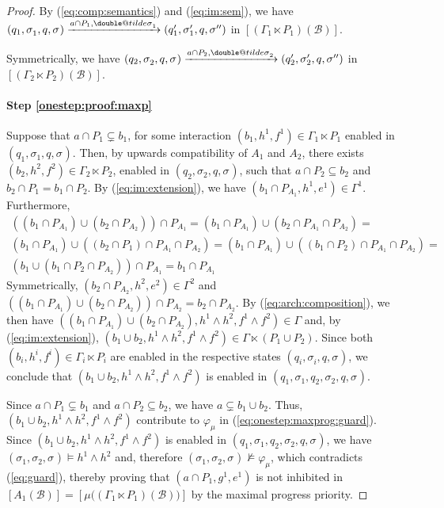 \documentclass{llncs}
\makeatletter
\newcommand{\eq}[1]{(\ref{eq:#1})}
\newcommand{\cB}{\ensuremath{\mathcal{B}}}
\newcommand{\goesto}[2][]{\ensuremath{\xrightarrow[#1]{#2}}}
\newcommand{\val}[3][]{\ensuremath{#1{\sigma}^{#2}_{#3}}}
\newcommand{\primeit}[1]{#1'}
\newcommand{\doubleprimeit}[1]{#1''}
\newcommand{\semopen}[1]{\ensuremath{[{#1}]}}
\newcommand{\IMextend}[2]{\ensuremath{#1 \ltimes #2}}
\newcommand{\expmix}{\wedge}
\newcommand{\doubletilde}[1]{{%
  \mathpalette\double@tilde{#1}%
}}
\newcommand{\double@tilde}[2]{%
  \sbox\z@{$\m@th#1\tilde{#2}$}%
  \ht\z@=.9\ht\z@
  \tilde{\box\z@}%
}
\makeatother
\begin{document}
\begin{proof}
  By \eq{comp:semantics} and \eq{im:sem}, we have
  $
  (q_1, \val{}{1}, q, \val{}{})
  \goesto{a \cap P_1, \val[\doubletilde]{}{1}}
  (q_1', \val[\primeit]{}{1}, q, \val[\doubleprimeit]{}{})
  $ in $\semopen{(\IMextend{\Gamma_1}{P_1})(\cB)}$.

  Symmetrically, we have 
  $
  (q_2, \val{}{2}, q, \val{}{})
  \goesto{a \cap P_2, \val[\doubletilde]{}{2}}
  (q_2', \val[\primeit]{}{2}, q, \val[\doubleprimeit]{}{})
  $ in $\semopen{(\IMextend{\Gamma_2}{P_2})(\cB)}$.   
   
  \paragraph*{Step \ref{onestep:proof:maxp}}
  Suppose that $a \cap P_1 \varsubsetneq b_1$, for some interaction
  $(b_1, h^1, f^1) \in \IMextend{\Gamma_1}{P_1}$ enabled in $(q_1,
  \val{}{1}, q, \val{}{})$.  Then, by upwards compatibility of $A_1$
  and $A_2$, there exists $(b_2, h^2, f^2) \in
  \IMextend{\Gamma_2}{P_2}$, enabled in $(q_2, \val{}{2}, q,
  \val{}{})$, such that $a \cap P_2 \subseteq b_2$ and $b_2 \cap P_1 =
  b_1 \cap P_2$.  By \eq{im:extension}, we have $(b_1 \cap P_{A_1},
  h^1, e^1) \in \Gamma^1$.  Furthermore,
%
  \begin{multline*}
    ((b_1 \cap P_{A_1}) \cup (b_2 \cap P_{A_2}))  \cap P_{A_1} =
    (b_1 \cap P_{A_1}) \cup (b_2 \cap P_{A_1} \cap P_{A_2}) =\\
    (b_1 \cap P_{A_1}) \cup ((b_2 \cap P_1) \cap P_{A_1} \cap P_{A_2}) =  
    (b_1 \cap P_{A_1}) \cup ((b_1 \cap P_2) \cap P_{A_1} \cap P_{A_2}) =\\
    (b_1 \cup (b_1 \cap P_2 \cap P_{A_2})) \cap P_{A_1} =
    b_1 \cap P_{A_1} 
  \end{multline*}
%
  Symmetrically, $(b_2 \cap P_{A_2}, h^2, e^2) \in \Gamma^2$ and
  $((b_1 \cap P_{A_1}) \cup (b_2 \cap P_{A_2})) \cap P_{A_2} = b_2
  \cap P_{A_2}$.  By \eq{arch:composition}, we then have $((b_1 \cap
  P_{A_1}) \cup (b_2 \cap P_{A_2}), h^1 \land h^2, f^1 \expmix f^2)
  \in \Gamma$ and, by \eq{im:extension}, $(b_1 \cup b_2, h^1 \land
  h^2, f^1 \expmix f^2) \in \IMextend{\Gamma}{(P_1 \cup P_2)}$.
%
  Since both $(b_i, h^i, f^i) \in \IMextend{\Gamma_i}{P_i}$ are
  enabled in the respective states $(q_i, \val{}{i}, q, \val{}{})$, we
  conclude that $(b_1 \cup b_2, h^1 \land h^2, f^1 \expmix f^2)$ is
  enabled in $(q_1, \val{}{1}, q_2, \val{}{2}, q, \val{}{})$.

  Since $a \cap P_1 \varsubsetneq b_1$ and $a \cap P_2 \subseteq b_2$,
  we have $a \varsubsetneq b_1 \cup b_2$.  Thus, $(b_1 \cup b_2, h^1
  \land h^2, f^1 \expmix f^2)$ contribute to $\varphi_\mu$ in
  \eq{onestep:maxprog:guard}.  Since $(b_1 \cup b_2, h^1 \land h^2,
  f^1 \expmix f^2)$ is enabled in $(q_1, \val{}{1}, q_2, \val{}{2}, q,
  \val{}{})$, we have $(\val{}{1}, \val{}{2}, \val{}{}) \models h^1
  \land h^2$ and, therefore $(\val{}{1}, \val{}{2}, \val{}{})
  \not\models \varphi_\mu$, which contradicts \eq{guard}, thereby
  proving that $(a \cap P_1, g^1, e^1)$ is not inhibited in
  $\semopen{A_1(\cB)} =
  \semopen{\mu\bigl((\IMextend{\Gamma_1}{P_1})(\cB)\bigr)}$ by the
  maximal progress priority.


\end{proof}
\end{document}
